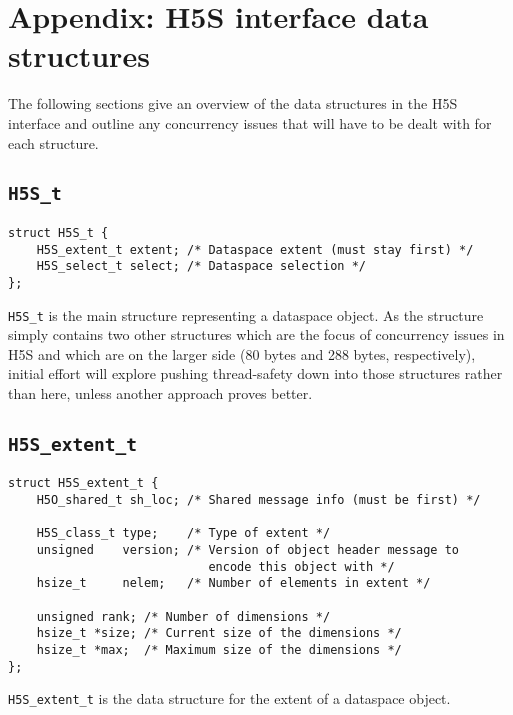 \documentclass[../HDF5_RFC.tex]{subfiles}
\begin{document}
\newpage

\section{Appendix: H5S interface data structures}
\label{apdx:h5s_data_structures}

The following sections give an overview of the data structures in the H5S interface
and outline any concurrency issues that will have to be dealt with for each structure.

\subsection{\texttt{H5S\_t}}
\label{apdx:h5s_struct_h5s_t}

\begin{verbatim}
struct H5S_t {
    H5S_extent_t extent; /* Dataspace extent (must stay first) */
    H5S_select_t select; /* Dataspace selection */
};
\end{verbatim}

\texttt{H5S\_t} is the main structure representing a dataspace object. As the structure
simply contains two other structures which are the focus of concurrency issues in H5S
and which are on the larger side (80 bytes and 288 bytes, respectively), initial effort
will explore pushing thread-safety down into those structures rather than here, unless
another approach proves better.

\subsection{\texttt{H5S\_extent\_t}}
\label{apdx:h5s_struct_h5s_extent_t}

\begin{verbatim}
struct H5S_extent_t {
    H5O_shared_t sh_loc; /* Shared message info (must be first) */

    H5S_class_t type;    /* Type of extent */
    unsigned    version; /* Version of object header message to
                            encode this object with */
    hsize_t     nelem;   /* Number of elements in extent */

    unsigned rank; /* Number of dimensions */
    hsize_t *size; /* Current size of the dimensions */
    hsize_t *max;  /* Maximum size of the dimensions */
};
\end{verbatim}

\texttt{H5S\_extent\_t} is the data structure for the extent of a dataspace object.
\end{document}
